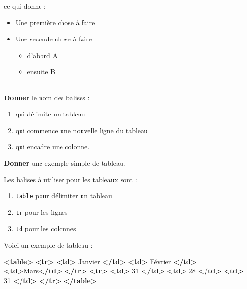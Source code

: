 \documentclass[a4paper,17pt]{extarticle}
\newenvironment{eleve}%
{\begin{activite}\color{noiramu}\\}
{\end{activite}}
\providecommand{\tightlist}{%
      \setlength{\itemsep}{0pt}\setlength{\parskip}{0pt}}
\newenvironment{Shaded}{}{}
\newcommand{\KeywordTok}[1]{\textcolor[rgb]{0.00,0.44,0.13}{\textbf{{#1}}}}
\newcommand{\NormalTok}[1]{{#1}}
\begin{document}
\begin{reponse}
ce qui donne :

\begin{itemize}
\tightlist
\item
  Une première chose à faire
\item
  Une seconde chose à faire

  \begin{itemize}
  \tightlist
  \item
    d'abord A
  \item
    ensuite B
  \end{itemize}
\end{itemize}

            \end{reponse}\begin{eleve}
    \textbf{Donner} le nom des balises :

\begin{enumerate}
\def\labelenumi{\arabic{enumi}.}
\tightlist
\item
  qui délimite un tableau
\item
  qui commence une nouvelle ligne du tableau
\item
  qui encadre une colonne.
\end{enumerate}

\textbf{Donner} une exemple simple de tableau.
        
        \end{eleve}\begin{reponse}
    Les balises à utiliser pour les tableaux sont :

\begin{enumerate}
\def\labelenumi{\arabic{enumi}.}
\tightlist
\item
  \texttt{table} pour délimiter un tableau
\item
  \texttt{tr} pour les lignes
\item
  \texttt{td} pour les colonnes
\end{enumerate}

Voici un exemple de tableau :

\begin{Shaded}
\begin{Highlighting}[]
\KeywordTok{\textless{}table\textgreater{}}
    \KeywordTok{\textless{}tr\textgreater{}}
        \KeywordTok{\textless{}td\textgreater{}}\NormalTok{ Janvier }\KeywordTok{\textless{}/td\textgreater{}} \KeywordTok{\textless{}td\textgreater{}}\NormalTok{ Février }\KeywordTok{\textless{}/td\textgreater{}} \KeywordTok{\textless{}td\textgreater{}}\NormalTok{Mars}\KeywordTok{\textless{}/td\textgreater{}}
    \KeywordTok{\textless{}/tr\textgreater{}}
    \KeywordTok{\textless{}tr\textgreater{}}
        \KeywordTok{\textless{}td\textgreater{}}\NormalTok{ 31 }\KeywordTok{\textless{}/td\textgreater{}} \KeywordTok{\textless{}td\textgreater{}}\NormalTok{ 28 }\KeywordTok{\textless{}/td\textgreater{}} \KeywordTok{\textless{}td\textgreater{}}\NormalTok{ 31 }\KeywordTok{\textless{}/td\textgreater{}}
    \KeywordTok{\textless{}/tr\textgreater{}}
\KeywordTok{\textless{}/table\textgreater{}}
\end{Highlighting}
\end{Shaded}


\end{reponse}
\end{document}
